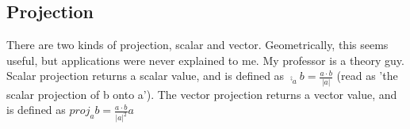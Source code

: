 \subsection{Projection}
There are two kinds of projection, scalar and vector. Geometrically, this seems useful, but applications were never explained to me. My professor is a theory guy. Scalar projection returns a scalar value, and is defined as $\comp_ab = \frac{a \cdot b}{|a|}$ (read as 'the scalar projection of b onto a'). The vector projection returns a vector value, and is defined as $proj_ab = \frac{a \cdot b}{|a|^2} a$
